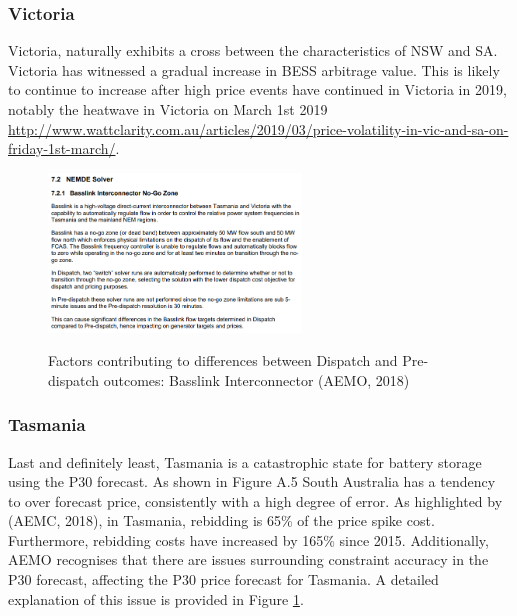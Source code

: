 \subsubsection{ Victoria }
Victoria, naturally exhibits a cross between the characteristics of NSW and SA. Victoria has witnessed a gradual increase in BESS arbitrage value. This is likely to continue to increase after high price events have continued in Victoria in 2019, notably the heatwave in Victoria on March 1st 2019 \url{http://www.wattclarity.com.au/articles/2019/03/price-volatility-in-vic-and-sa-on-friday-1st-march/}.
\begin{figure}
    \begin{center}
    \centering
    \includegraphics[width=0.6\textwidth]{Pictures/Chapter4/basslink.png}
    \label{fig:basslink_actual}
    \caption{Factors contributing to differences between Dispatch and Pre-dispatch outcomes: Basslink Interconnector (AEMO, 2018)}
    \end{center}
\end{figure}
\subsubsection{Tasmania}
Last and definitely least, Tasmania is a catastrophic state for battery storage using the P30 forecast. As shown in Figure A.5 South Australia has a tendency to over forecast price, consistently with a high degree of error. As highlighted by (AEMC, 2018), in Tasmania, rebidding is 65\% of the price spike cost. Furthermore, rebidding costs have increased by
165\% since 2015. Additionally, AEMO recognises that there are issues surrounding constraint accuracy in the P30 forecast, affecting the P30 price forecast for Tasmania. A detailed explanation of this issue is provided in Figure \ref{fig:basslink_actual}.
